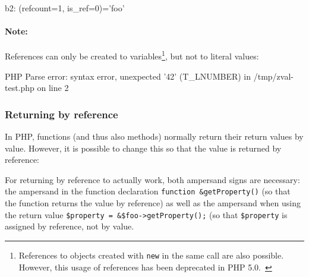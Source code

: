 \begin{textcode}
b2: (refcount=1, is_ref=0)='foo'
\end{textcode}

\paragraph{Note:} References can only be created to variables\footnote{References to objects created with \texttt{new} in the same call are also possible. However, this usage of references has been deprecated in PHP 5.0.~\cite{php-manual-what-references-do}}, but not to literal values:


\begin{textcode}
PHP Parse error:  syntax error, unexpected '42' (T_LNUMBER) in
  /tmp/zval-test.php on line 2
\end{textcode}


\subsubsection{Returning by reference}

In PHP, functions (and thus also methods) normally return their return values by value. However, it is possible to change this so that the value is returned by reference:~\cite{php-manual-returning-reference}



For returning by reference to actually work, both ampersand signs are necessary: the ampersand in the function declaration \texttt{function \&getProperty()} (so that the function returns the value by reference) as well as the ampersand when using the return value \texttt{\$property = \&\$foo->getProperty();} (so that \texttt{\$property} is assigned by reference, not by value.


